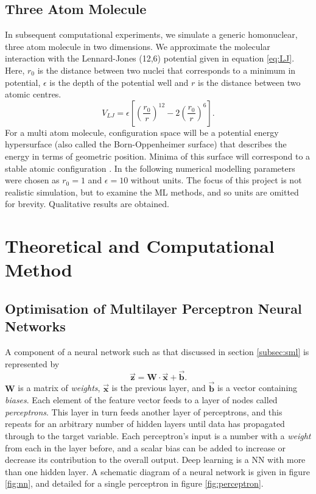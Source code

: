 \documentclass[12pt,a4paper]{article}
\begin{document}
\subsection{Three Atom Molecule}
In subsequent computational experiments, we simulate a generic homonuclear, three atom molecule in two dimensions. We approximate the molecular interaction with the Lennard-Jones (12,6) potential \cite{Lennard_Jones_1931} given in equation \ref{eq:LJ}. Here, $r_0$ is the distance between two nuclei that corresponds to a minimum in potential, $\epsilon$ is the depth of the potential well and $r$ is the distance between two atomic centres. 
\begin{equation}\label{eq:LJ}
    V_{LJ} = \epsilon \left[ \left(\frac{r_0}{r}\right)^{12} - 2 \left(\frac{r_0}{r}\right)^6 \right].
\end{equation}
For a multi atom molecule, configuration space will be a potential energy hypersurface (also called the Born-Oppenheimer surface) that describes the energy in terms of geometric position. Minima of this surface will correspond to a stable atomic configuration \cite{partay_efficient_2010}. In the following numerical  modelling parameters were chosen as $r_0=1$ and $\epsilon=10$ without units. The focus of this project is not realistic simulation, but to examine the ML methods, and so units are omitted for brevity. Qualitative results are obtained.

\section{Theoretical and Computational Method}
\subsection{Optimisation of Multilayer Perceptron Neural Networks}
A component of a neural network such as that discussed in section \ref{subsec:sml} is represented by 
\begin{equation} \label{eq:nn}
    \vec{\textbf{z}} = \mathbf{W} \cdot \vec{\mathbf{x}} + \vec{\textbf{b}}.
\end{equation}
 $\textbf{W}$ is a matrix of \emph{weights}, $\vec{\mathbf{x}}$ is the previous layer, and $\vec{\textbf{b}}$ is a vector containing \emph{biases}. Each element of the feature vector feeds to a layer of nodes called \emph{perceptrons}. This layer in turn feeds another layer of perceptrons, and this repeats for an arbitrary number of hidden layers until data has propagated through to the target variable. Each perceptron's input is a number with a \emph{weight} from each in the layer before, and a scalar bias can be added to increase or decrease its contribution to the overall output. Deep learning is a NN with more than one hidden layer. A schematic diagram of a neural network is given in figure \ref{fig:nn}, and detailed for a single perceptron in figure \ref{fig:perceptron}.
\end{document}
